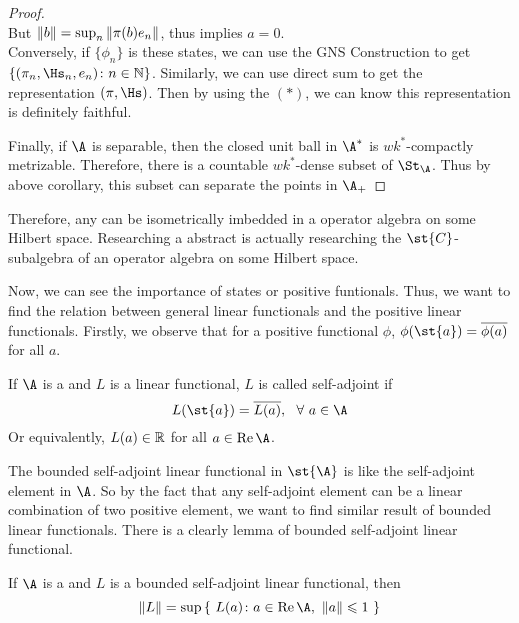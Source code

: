 \begin{proof}
\begin{equation}
	\end{equation}
	But $\left\lVert b\right\lVert = \sup_{n} \left\lVert\pi(b)e_n\right\lVert$, thus implies $a = 0$.\\
	Conversely, if $\{\phi_n\}$ is these states, we can use the GNS Construction to get $\{(\pi_n,\Hs_n,e_n) \colon n \in \N\}$. Similarly, we can use direct sum to get the representation $(\pi,\Hs)$. Then by using the $(*)$, we can know this representation is definitely faithful.
	\item Finally, if $\A$ is separable, then the closed unit ball in $\A^{*}$ is $wk^{*}$-compactly metrizable. Therefore, there is a countable $wk^{*}$-dense subset of $\St_{\A}$. Thus by above corollary, this subset can separate the points in $\A_{+}$
\end{proof}
\begin{rem}
	Therefore, any \Cs can be isometrically imbedded in a operator algebra on some Hilbert space. Researching a abstract \Cs is actually researching the $\st{C}$-subalgebra of an operator algebra on some Hilbert space.
\end{rem}

Now, we can see the importance of states or positive funtionals. Thus, we want to find the relation between general linear functionals and the positive linear functionals. Firstly, we observe that for a positive functional $\phi$, $\phi(\st{a})=\clo{\phi(a)}$ for all $a$. 
\begin{defn}
	If $\A$ is a \Cs and $L$ is a linear functional, $L$ is called self-adjoint if 
	\begin{equation*}
		L(\st{a})=\clo{L(a)},~~ \forall~ a \in \A
	\end{equation*}
	Or equivalently, $L(a) \in \mathbb{R}$ for all $a \in \Rea{\A}$.
\end{defn}

The bounded self-adjoint linear functional in $\st{\A}$ is like the self-adjoint element in $\A$. So by the fact that any self-adjoint element can be a linear combination of two positive element, we want to find similar result of bounded linear functionals. There is a clearly lemma of bounded self-adjoint linear functional.

\begin{lem}
	If $\A$ is a \Cs and $L$ is a bounded self-adjoint linear functional, then
	\begin{equation*}
		\norm{L} = \sup{\{~L(a) \colon a \in \Rea{\A},~\norm{a} \leqslant 1~\}}
	\end{equation*}
\end{lem}


